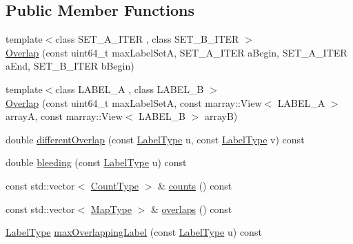 \subsection*{Public Member Functions}
\begin{DoxyCompactItemize}
\item 
{\footnotesize template$<$class S\+E\+T\+\_\+\+A\+\_\+\+I\+T\+E\+R , class S\+E\+T\+\_\+\+B\+\_\+\+I\+T\+E\+R $>$ }\\\hyperlink{classnifty_1_1ground__truth_1_1Overlap_aedaa9af95b736f17f2dbfe0eff4c09bf}{Overlap} (const uint64\+\_\+t max\+Label\+Set\+A, S\+E\+T\+\_\+\+A\+\_\+\+I\+T\+E\+R a\+Begin, S\+E\+T\+\_\+\+A\+\_\+\+I\+T\+E\+R a\+End, S\+E\+T\+\_\+\+B\+\_\+\+I\+T\+E\+R b\+Begin)
\item 
{\footnotesize template$<$class L\+A\+B\+E\+L\+\_\+\+A , class L\+A\+B\+E\+L\+\_\+\+B $>$ }\\\hyperlink{classnifty_1_1ground__truth_1_1Overlap_a0a40f259581e8a4d9e594fd1db23170a}{Overlap} (const uint64\+\_\+t max\+Label\+Set\+A, const marray\+::\+View$<$ L\+A\+B\+E\+L\+\_\+\+A $>$ array\+A, const marray\+::\+View$<$ L\+A\+B\+E\+L\+\_\+\+B $>$ array\+B)
\item 
double \hyperlink{classnifty_1_1ground__truth_1_1Overlap_adfacb68ed0047e88cbe3524ad664f02f}{different\+Overlap} (const \hyperlink{classnifty_1_1ground__truth_1_1Overlap_af14b9a872d3736d3115231866bc71612}{Label\+Type} u, const \hyperlink{classnifty_1_1ground__truth_1_1Overlap_af14b9a872d3736d3115231866bc71612}{Label\+Type} v) const 
\item 
double \hyperlink{classnifty_1_1ground__truth_1_1Overlap_ad4518e3941b75c18091cefa145a7ce2b}{bleeding} (const \hyperlink{classnifty_1_1ground__truth_1_1Overlap_af14b9a872d3736d3115231866bc71612}{Label\+Type} u) const 
\item 
const std\+::vector$<$ \hyperlink{classnifty_1_1ground__truth_1_1Overlap_ab8f82b8fef890dc3d7b69da0cc768c76}{Count\+Type} $>$ \& \hyperlink{classnifty_1_1ground__truth_1_1Overlap_a5c530575bb3d2657948424263dfcc3a9}{counts} () const 
\item 
const std\+::vector$<$ \hyperlink{classnifty_1_1ground__truth_1_1Overlap_a6866ee8c988dd21d3fbd6ee5c2e836bf}{Map\+Type} $>$ \& \hyperlink{classnifty_1_1ground__truth_1_1Overlap_aa2bacf84117795f844bccbd698afada2}{overlaps} () const 
\item 
\hyperlink{classnifty_1_1ground__truth_1_1Overlap_af14b9a872d3736d3115231866bc71612}{Label\+Type} \hyperlink{classnifty_1_1ground__truth_1_1Overlap_a0e7d6a73dae11d4a87e379add45a9a4f}{max\+Overlapping\+Label} (const \hyperlink{classnifty_1_1ground__truth_1_1Overlap_af14b9a872d3736d3115231866bc71612}{Label\+Type} u) const 

\end{DoxyCompactItemize}
